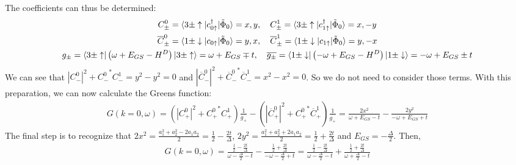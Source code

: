 \documentclass[10pt]{report}
\numberwithin{equation}{section}
\begin{document}
The coefficients can thus be determined:
\begin{gather*}
	C^0_\pm = \braket{3\pm \uparrow|c^\dagger_{0 \uparrow} |\tilde \Phi_0} = x, y, ~ ~ ~ C^1_\pm = \braket{3\pm \uparrow|c^\dagger_{1 \uparrow} |\tilde \Phi_0} = x, -y\\
	\overline C^0_\pm = \braket{1 \pm \downarrow|c_{0 \uparrow} |\tilde \Phi_0} = y, x, ~ ~ ~\overline C^1_\pm = \braket{1 \pm \downarrow|c_{1 \uparrow} |\tilde \Phi_0} = y, -x\\
	g_\pm = \bra{3 \pm \uparrow}\left( \omega + E_{GS} - H^D\right) \ket{3 \pm \uparrow} = \omega + E_{GS} \mp t, ~ ~ ~\overline{g_\pm} = \bra{1 \pm \downarrow}\left(-\omega + E_{GS} - H^D\right) \ket{1 \pm \downarrow} = -\omega + E_{GS} \pm t\\
\end{gather*}
We can see that $|C^0_-|^2 + {C^0_-}^* C^1_- = y^2 - y^2 = 0$ and $|\overline C^0_-|^2 + {\overline C^0_-}^* \overline C^1_- = x^2 - x^2 = 0$. So we do not need to consider those terms. With this preparation, we can now calculate the Greens function:
\begin{equation}\begin{aligned}
	G(k=0, \omega) = \left(|C^0_{+}|^2 + {C^0_{+}}^* C^1_{+} \right)\frac{1}{g_+} - \left(|\overline C^0_{+}|^2 + {C^0_{+}}^* \overline C^1_{+}\right)\frac{1}{\overline{g_+}} = \frac{2x^2}{\omega + E_{GS} - t} - \frac{2y^2}{-\omega + E_{GS} + t}
\end{aligned}\end{equation}
The final step is to recognize that $2x^2 = \frac{a_1^2 + a_2^2 -2a_1a_2}{2} = \frac{1}{2} - \frac{2t}{\Delta}$, $2y^2 = \frac{a_1^2 + a_2^2 + 2a_1a_2}{2} = \frac{1}{2} + \frac{2t}{\Delta}$ and $E_{GS} = -\frac{\Delta}{2}$. Then,
\begin{equation}\begin{aligned}
	G(k=0, \omega) = \frac{\frac{1}{2} - \frac{2t}{\Delta}}{\omega - \frac{\Delta}{2} - t} - \frac{\frac{1}{2} + \frac{2t}{\Delta}}{-\omega - \frac{\Delta}{2} + t} = \frac{\frac{1}{2} - \frac{2t}{\Delta}}{\omega - \frac{\Delta}{2} - t} + \frac{\frac{1}{2} + \frac{2t}{\Delta}}{\omega + \frac{\Delta}{2} - t}
\end{aligned}\end{equation}
\end{document}
